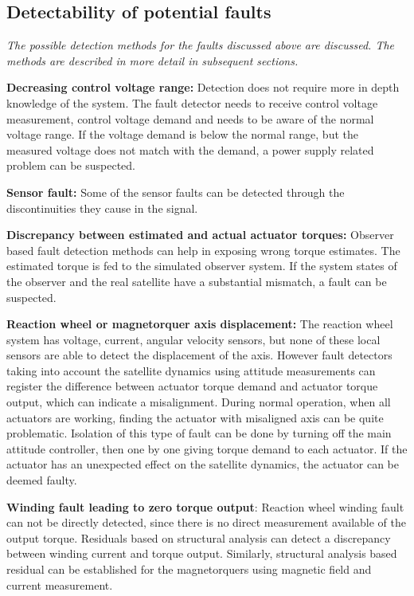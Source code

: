\subsection{Detectability of potential faults}

\textit{The possible detection methods for the faults discussed above are discussed. The methods are described in more detail in subsequent sections.}

\textbf{Decreasing control voltage range:}
Detection does not require more in depth knowledge of the system. The fault detector needs to receive control voltage measurement, control voltage demand and needs to be aware of the normal voltage range. If the voltage demand is below the normal range, but the measured voltage does not match with the demand, a power supply related problem can be suspected.

\textbf{Sensor fault:}
Some of the sensor faults can be detected through the discontinuities they cause in the signal.

\textbf{Discrepancy between estimated and actual actuator torques:}
Observer based fault detection methods can help in exposing wrong torque estimates. The estimated torque is fed to the simulated observer system. If the system states of the observer and the real satellite have a substantial mismatch, a fault can be suspected.

\textbf{Reaction wheel or magnetorquer axis displacement:}
The reaction wheel system has voltage, current, angular velocity sensors, but none of these local sensors are able to detect the displacement of the axis. However fault detectors taking into account the satellite dynamics using attitude measurements can register the difference between actuator torque demand and actuator torque output, which can indicate a misalignment. During normal operation, when all actuators are working, finding the actuator with misaligned axis can be quite problematic. Isolation of this type of fault can be done by turning off the main attitude controller, then one by one giving torque demand to each actuator. If the actuator has an unexpected effect on the satellite dynamics, the actuator can be deemed faulty. 

\textbf{Winding fault leading to zero torque output}:
Reaction wheel winding fault can not be directly detected, since there is no direct measurement available of the output torque. Residuals based on structural analysis can detect a discrepancy between winding current and torque output. Similarly, structural analysis based residual can be established for the magnetorquers using magnetic field and current measurement.

